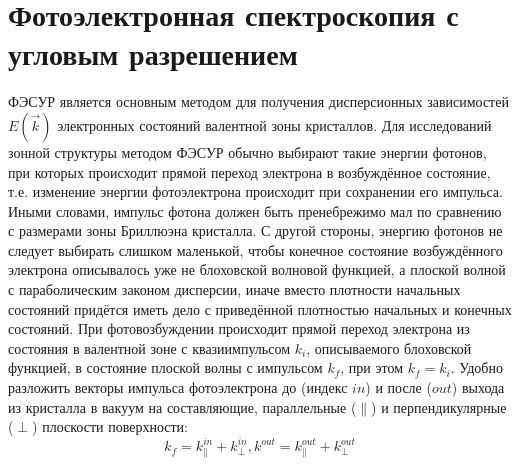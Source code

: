 \section{ Фотоэлектронная спектроскопия с угловым разрешением}  \label{chapt3}
ФЭСУР является основным методом для получения дисперсионных зависимостей $E(\overrightarrow{k})$ электронных состояний валентной зоны кристаллов. Для исследований зонной структуры методом ФЭСУР обычно выбирают такие энергии фотонов, при которых происходит прямой переход электрона в возбуждённое состояние, т.е. изменение энергии фотоэлектрона происходит при сохранении его импульса. Иными словами, импульс фотона должен быть пренебрежимо мал по сравнению с размерами зоны Бриллюэна кристалла. С другой стороны, энергию фотонов не следует выбирать слишком маленькой, чтобы конечное состояние возбуждённого электрона описывалось уже не блоховской волновой функцией, а плоской волной с параболическим законом дисперсии, иначе вместо плотности начальных состояний придётся иметь дело с приведённой плотностью начальных и конечных состояний.
При фотовозбуждении происходит прямой переход электрона из состояния в валентной зоне с квазиимпульсом $k_i$, описываемого блоховской функцией, в состояние плоской волны с импульсом $k_f$, при этом $k_f=k_i$.  Удобно разложить векторы импульса фотоэлектрона до (индекс $in$) и после ($out$) выхода из кристалла в вакуум на составляющие, параллельные ($\parallel$) и перпендикулярные ($\perp$) плоскости поверхности:
 	\begin{equation}
  \label{eq:arpes2}
k_f=k^{in}_\parallel+k^{in}_\perp, k^{out}=k^{out}_\parallel+k^{out}_\perp
\end{equation}

